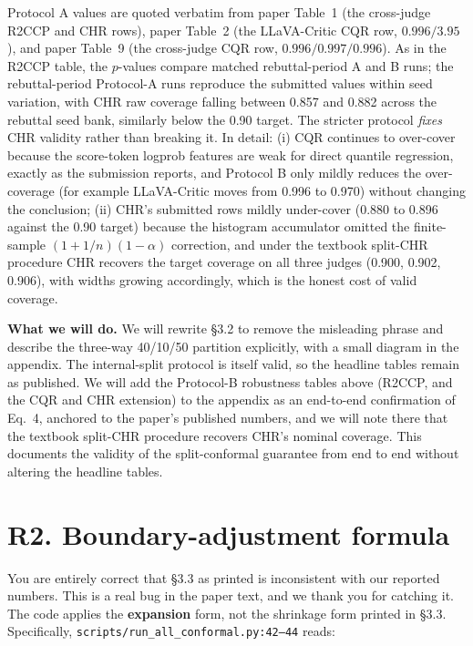 \documentclass[11pt]{article}
\begin{document}
Protocol A values are quoted verbatim from paper Table~1 (the cross-judge R2CCP and CHR rows), paper Table~2 (the LLaVA-Critic CQR row, $0.996/3.95$), and paper Table~9 (the cross-judge CQR row, $0.996/0.997/0.996$). As in the R2CCP table, the $p$-values compare matched rebuttal-period A and B runs; the rebuttal-period Protocol-A runs reproduce the submitted values within seed variation, with CHR raw coverage falling between 0.857 and 0.882 across the rebuttal seed bank, similarly below the 0.90 target. The stricter protocol \emph{fixes} CHR validity rather than breaking it. In detail: (i) CQR continues to over-cover because the score-token logprob features are weak for direct quantile regression, exactly as the submission reports, and Protocol B only mildly reduces the over-coverage (for example LLaVA-Critic moves from 0.996 to 0.970) without changing the conclusion; (ii) CHR's submitted rows mildly under-cover (0.880 to 0.896 against the 0.90 target) because the histogram accumulator omitted the finite-sample $(1 + 1/n)(1 - \alpha)$ correction, and under the textbook split-CHR procedure CHR recovers the target coverage on all three judges (0.900, 0.902, 0.906), with widths growing accordingly, which is the honest cost of valid coverage.

\textbf{What we will do.} We will rewrite \S 3.2 to remove the misleading phrase and describe the three-way 40/10/50 partition explicitly, with a small diagram in the appendix. The internal-split protocol is itself valid, so the headline tables remain as published. We will add the Protocol-B robustness tables above (R2CCP, and the CQR and CHR extension) to the appendix as an end-to-end confirmation of Eq.\ 4, anchored to the paper's published numbers, and we will note there that the textbook split-CHR procedure recovers CHR's nominal coverage. This documents the validity of the split-conformal guarantee from end to end without altering the headline tables.

\section*{R2. Boundary-adjustment formula}

You are entirely correct that \S 3.3 as printed is inconsistent with our reported numbers. This is a real bug in the paper text, and we thank you for catching it. The code applies the \textbf{expansion} form, not the shrinkage form printed in \S 3.3. Specifically, \texttt{scripts/run\_all\_conformal.py:42--44} reads:
\end{document}
